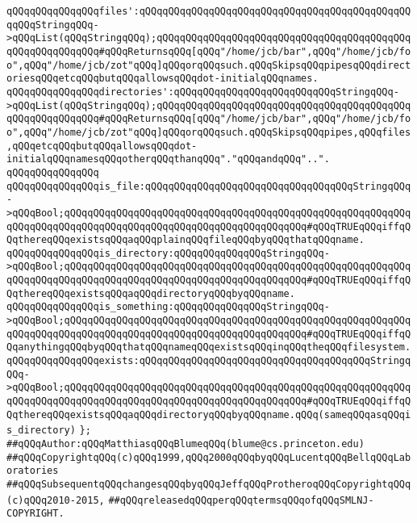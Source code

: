 \newline
\verb|qQQqqQQqqQQqqQQqfiles':qQQqqQQqqQQqqQQqqQQqqQQqqQQqqQQqqQQqqQQqqQQqqQQqqQQqStringqQQq->qQQqList(qQQqStringqQQq);qQQqqQQqqQQqqQQqqQQqqQQqqQQqqQQqqQQqqQQqqQQqqQQqqQQqqQQqqQQq#qQQqReturnsqQQq[qQQq"/home/jcb/bar",qQQq"/home/jcb/foo",qQQq"/home/jcb/zot"qQQq]qQQqorqQQqsuch.qQQqSkipsqQQqpipesqQQqdirectoriesqQQqetcqQQqbutqQQqallowsqQQqdot-initialqQQqnames.|\newline
\verb|qQQqqQQqqQQqqQQqdirectories':qQQqqQQqqQQqqQQqqQQqqQQqqQQqStringqQQq->qQQqList(qQQqStringqQQq);qQQqqQQqqQQqqQQqqQQqqQQqqQQqqQQqqQQqqQQqqQQqqQQqqQQqqQQqqQQq#qQQqReturnsqQQq[qQQq"/home/jcb/bar",qQQq"/home/jcb/foo",qQQq"/home/jcb/zot"qQQq]qQQqorqQQqsuch.qQQqSkipsqQQqpipes,qQQqfiles,qQQqetcqQQqbutqQQqallowsqQQqdot-initialqQQqnamesqQQqotherqQQqthanqQQq"."qQQqandqQQq"..".|\newline
\verb|qQQqqQQqqQQqqQQq|\newline
\verb|qQQqqQQqqQQqqQQqis_file:qQQqqQQqqQQqqQQqqQQqqQQqqQQqqQQqqQQqStringqQQq->qQQqBool;qQQqqQQqqQQqqQQqqQQqqQQqqQQqqQQqqQQqqQQqqQQqqQQqqQQqqQQqqQQqqQQqqQQqqQQqqQQqqQQqqQQqqQQqqQQqqQQqqQQqqQQqqQQqqQQq#qQQqTRUEqQQqiffqQQqthereqQQqexistsqQQqaqQQqplainqQQqfileqQQqbyqQQqthatqQQqname.|\newline
\verb|qQQqqQQqqQQqqQQqis_directory:qQQqqQQqqQQqqQQqStringqQQq->qQQqBool;qQQqqQQqqQQqqQQqqQQqqQQqqQQqqQQqqQQqqQQqqQQqqQQqqQQqqQQqqQQqqQQqqQQqqQQqqQQqqQQqqQQqqQQqqQQqqQQqqQQqqQQqqQQqqQQq#qQQqTRUEqQQqiffqQQqthereqQQqexistsqQQqaqQQqdirectoryqQQqbyqQQqname.|\newline
\verb|qQQqqQQqqQQqqQQqis_something:qQQqqQQqqQQqqQQqStringqQQq->qQQqBool;qQQqqQQqqQQqqQQqqQQqqQQqqQQqqQQqqQQqqQQqqQQqqQQqqQQqqQQqqQQqqQQqqQQqqQQqqQQqqQQqqQQqqQQqqQQqqQQqqQQqqQQqqQQqqQQq#qQQqTRUEqQQqiffqQQqanythingqQQqbyqQQqthatqQQqnameqQQqexistsqQQqinqQQqtheqQQqfilesystem.|\newline
\verb|qQQqqQQqqQQqqQQqexists:qQQqqQQqqQQqqQQqqQQqqQQqqQQqqQQqqQQqqQQqStringqQQq->qQQqBool;qQQqqQQqqQQqqQQqqQQqqQQqqQQqqQQqqQQqqQQqqQQqqQQqqQQqqQQqqQQqqQQqqQQqqQQqqQQqqQQqqQQqqQQqqQQqqQQqqQQqqQQqqQQqqQQq#qQQqTRUEqQQqiffqQQqthereqQQqexistsqQQqaqQQqdirectoryqQQqbyqQQqname.qQQq(sameqQQqasqQQqis_directory)|\newline
\verb|};|\newline
\newline
\newline
\verb|##qQQqAuthor:qQQqMatthiasqQQqBlumeqQQq(blume@cs.princeton.edu)|\newline
\verb|##qQQqCopyrightqQQq(c)qQQq1999,qQQq2000qQQqbyqQQqLucentqQQqBellqQQqLaboratories|\newline
\verb|##qQQqSubsequentqQQqchangesqQQqbyqQQqJeffqQQqProtheroqQQqCopyrightqQQq(c)qQQq2010-2015,|\newline
\verb|##qQQqreleasedqQQqperqQQqtermsqQQqofqQQqSMLNJ-COPYRIGHT.|\newline

